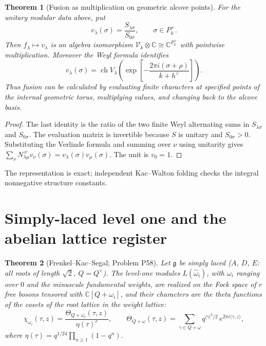 \documentclass[11pt]{article}
\newtheorem{theorem}{Theorem}[section]
\theoremstyle{definition}
\theoremstyle{remark}
\newcommand{\C}{\mathbb{C}}
\begin{document}
\begin{theorem}[Fusion as multiplication on geometric alcove points]\label{thm:fusion-evaluation}
For the unitary modular data above, put
\[
 v_\lambda(\sigma)=\frac{S_{\lambda\sigma}}{S_{0\sigma}},
 \qquad \sigma\in P_k^+.
\]
Then $f_\lambda\mapsto v_\lambda$ is an algebra isomorphism
$\mathcal V_k\otimes\C\cong\C^{P_k^+}$ with pointwise multiplication.
Moreover the Weyl formula identifies
\[
 v_\lambda(\sigma)=
 \operatorname{ch}V_\lambda
 \left(\exp\left[-\frac{2\pi i(\sigma+\rho)}{k+h^\vee}\right]\right).
\]
Thus fusion can be calculated by evaluating finite characters at specified
points of the internal geometric torus, multiplying values, and changing
back to the alcove basis.
\end{theorem}
\begin{proof}
The last identity is the ratio of the two finite Weyl alternating sums
in $S_{\lambda\sigma}$ and $S_{0\sigma}$. The evaluation matrix is
invertible because $S$ is unitary and $S_{0\sigma}>0$. Substituting the
Verlinde formula and summing over $\nu$ using unitarity gives
$\sum_\nu N_{\lambda\mu}^{\ \nu}v_\nu(\sigma)
=v_\lambda(\sigma)v_\mu(\sigma)$. The unit is $v_0=1$.
\end{proof}
The representation is exact; independent Kac--Walton folding checks the
integral nonnegative structure constants.

\section{Simply-laced level one and the abelian lattice register}\label{sec:frenkelkac}

\begin{theorem}[Frenkel--Kac--Segal; Problem P58]\label{thm:fk}
Let $\mathfrak g$ be simply laced ($A$, $D$, $E$: all roots of length
$\sqrt2$, $Q = Q^\vee$). The level-one modules $L(\hat\omega_i)$, with
$\omega_i$ ranging over $0$ and the minuscule fundamental weights, are
realized on the Fock space of $r$ free bosons tensored with
$\C[Q+\omega_i]$, and their characters are the theta functions of the
cosets of the root lattice in the weight lattice:
\[
  \chi_{\omega_i}(\tau,z) = \frac{\Theta_{Q+\omega_i}(\tau,z)}{\eta(\tau)^r},\qquad
  \Theta_{Q+\omega}(\tau,z) = \sum_{\gamma\in Q+\omega}q^{|\gamma|^2/2}\,e^{2\pi i\langle\gamma,z\rangle},
\]
where $\eta(\tau) = q^{1/24}\prod_{n\ge1}(1-q^n)$.
\end{theorem}
\end{document}
